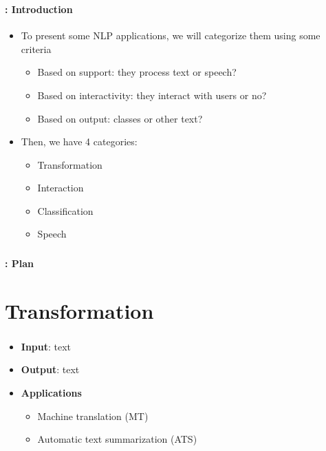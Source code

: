 \documentclass[xcolor=table]{beamer}
\subtitle[11- Some applications]{Chapter 11\\Some applications}
\begin{document}
	
\begin{frame}
	\frametitle{\inserttitle}
	\framesubtitle{\insertshortsubtitle: Introduction}

	\begin{itemize}
		\item To present some NLP applications, we will categorize them using some criteria
		\begin{itemize}
			\item Based on support: they process text or speech?
			\item Based on interactivity: they interact with users or no?
			\item Based on output: classes or other text?
		\end{itemize}
		\item Then, we have 4 categories:
		\begin{itemize}
			\item Transformation
			\item Interaction
			\item Classification
			\item Speech
		\end{itemize}
	\end{itemize}

\end{frame}

\begin{frame}
	\frametitle{\inserttitle}
	\framesubtitle{\insertshortsubtitle: Plan}

	\begin{multicols}{2}
	\tableofcontents
	\end{multicols}

\end{frame}

\section{Transformation}

\begin{frame}
	\frametitle{\insertshortsubtitle}
	\framesubtitle{\insertsection}
	
	\begin{itemize}
		\item \textbf{Input}: text 
		\item \textbf{Output}: text
		\item \textbf{Applications} 
		\begin{itemize}
			\item Machine translation (MT)
			\item Automatic text summarization (ATS)
		\end{itemize}
	\end{itemize}

\end{frame}
\end{document}
